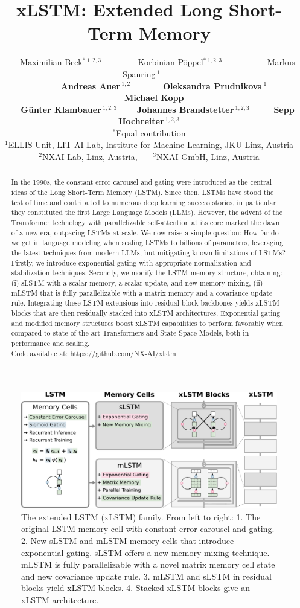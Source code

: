 \documentclass[dvipsnames]{article}
\title{xLSTM: Extended Long Short-Term Memory}
\author{%
  \ \ \ \   Maximilian Beck$^{* \ 1,2,3}$
  \ \ \ \ \ \ \ \
  Korbinian P\"{o}ppel$^{* \ 1,2,3}$
  \ \ \ \ \ \ \ \ \ \
  Markus Spanring$^{\ 1}$ \ \ \ \\
  \ \ \ \ \ \ \ \textbf{Andreas Auer}$^{\ 1,2}$
 \ \ \ \ \ \ \
  \textbf{Oleksandra Prudnikova}$^{\ 1}$ 
\ \ \ \ \ \ \ \ \ \ \ 
  \textbf{Michael Kopp} \ \ \ \ \ \ \ \ \\
   \ \ \ \  \textbf{G\"{u}nter Klambauer}$^{\ 1,2,3}$ 
  \ \ \ \ 
  \textbf{Johannes Brandstetter}$^{\ 1,2,3}$
  \ \ \ \ \ 
  \textbf{Sepp Hochreiter}$^{\ 1,2,3}$ \\ 
{$^*$}{Equal contribution}\\ %
{$^1$}{ELLIS Unit, LIT AI Lab, Institute for Machine Learning, JKU Linz, Austria}\\
{$^2$}{NXAI Lab, Linz, Austria}, \ \ \ 
{$^3$}{NXAI GmbH, Linz, Austria}
}
\newcommand{\stoptocwriting}{%
  \addtocontents{toc}{\protect\setcounter{tocdepth}{-5}}}
\begin{document}
\stoptocwriting

\maketitle
\vspace{-0.3cm}
\begin{abstract}
\vspace{-0.3cm}
In the 1990s, the constant error carousel and gating were introduced
as the central ideas of the Long Short-Term Memory (LSTM). 
Since then, LSTMs have stood the test of time 
and contributed to numerous deep learning success stories,
in particular they constituted the first Large Language Models (LLMs).
However, the advent of the Transformer technology with 
parallelizable self-attention at its core 
marked the dawn of a new era, outpacing LSTMs at scale.  
We now raise a simple question: 
How far do we get in language modeling 
when scaling LSTMs to billions of parameters, 
leveraging the latest techniques from modern LLMs,
but mitigating known limitations of LSTMs? 
Firstly, we introduce exponential gating 
with appropriate normalization and stabilization techniques. 
Secondly, we modify the LSTM memory structure, obtaining: 
(i) sLSTM with a scalar memory, a scalar update, and new memory mixing,
(ii) mLSTM that is fully parallelizable 
with a matrix memory and a covariance update rule.
Integrating these LSTM extensions into residual block backbones 
yields xLSTM blocks that are then residually stacked into xLSTM architectures.
Exponential gating and modified memory structures boost xLSTM capabilities to perform favorably 
when compared to state-of-the-art Transformers and 
State Space Models, both in performance and scaling.\\
Code available at: \url{https://github.com/NX-AI/xlstm}
\end{abstract}

\begin{figure}[H]
\vspace{-0.8em}
\centering
\includegraphics[width=1.\textwidth]{figures/desc_xlstm_overview.pdf}
\vspace{-0.8em}
\caption{The extended LSTM (xLSTM) family. From left to right: 
1. The original LSTM memory cell with constant error carousel and gating. 
2. New sLSTM and mLSTM memory cells that 
introduce exponential gating. 
sLSTM offers a new memory mixing technique. 
mLSTM is fully parallelizable with a novel matrix memory cell state and new
covariance update rule. 
3. mLSTM and sLSTM in 
residual blocks yield xLSTM blocks. 
4. Stacked xLSTM blocks give an 
xLSTM architecture. \label{fig:xlstm_sketch}}
\end{figure}
\end{document}
